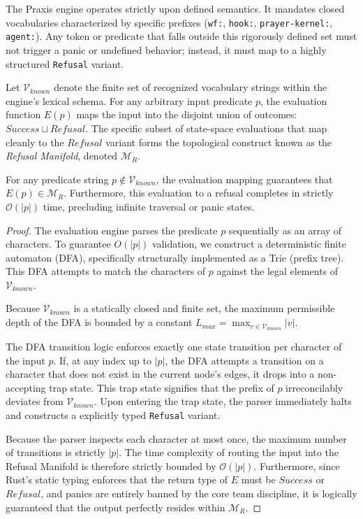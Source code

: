The Praxis engine operates strictly upon defined semantics. It mandates closed vocabularies characterized by specific prefixes (\texttt{wf:}, \texttt{hook:}, \texttt{prayer-kernel:}, \texttt{agent:}). Any token or predicate that falls outside this rigorously defined set must not trigger a panic or undefined behavior; instead, it must map to a highly structured \texttt{Refusal} variant. 

\begin{definition}
Let $\mathcal{V}_{known}$ denote the finite set of recognized vocabulary strings within the engine's lexical schema. For any arbitrary input predicate $p$, the evaluation function $E(p)$ maps the input into the disjoint union of outcomes: $Success \sqcup Refusal$. The specific subset of state-space evaluations that map cleanly to the $Refusal$ variant forms the topological construct known as the \textit{Refusal Manifold}, denoted $\mathcal{M}_R$.
\end{definition}

\begin{theorem}
\label{thm:refusal_completeness}
For any predicate string $p \notin \mathcal{V}_{known}$, the evaluation mapping guarantees that $E(p) \in \mathcal{M}_R$. Furthermore, this evaluation to a refusal completes in strictly $\mathcal{O}(|p|)$ time, precluding infinite traversal or panic states.
\end{theorem}

\begin{proof}
The evaluation engine parses the predicate $p$ sequentially as an array of characters. To guarantee $O(|p|)$ validation, we construct a deterministic finite automaton (DFA), specifically structurally implemented as a Trie (prefix tree). This DFA attempts to match the characters of $p$ against the legal elements of $\mathcal{V}_{known}$.

Because $\mathcal{V}_{known}$ is a statically closed and finite set, the maximum permissible depth of the DFA is bounded by a constant $L_{max} = \max_{v \in \mathcal{V}_{known}} |v|$.

The DFA transition logic enforces exactly one state transition per character of the input $p$. 
If, at any index up to $|p|$, the DFA attempts a transition on a character that does not exist in the current node's edges, it drops into a non-accepting trap state. This trap state signifies that the prefix of $p$ irreconcilably deviates from $\mathcal{V}_{known}$. Upon entering the trap state, the parser immediately halts and constructs a explicitly typed \texttt{Refusal} variant.

Because the parser inspects each character at most once, the maximum number of transitions is strictly $|p|$. The time complexity of routing the input into the Refusal Manifold is therefore strictly bounded by $\mathcal{O}(|p|)$. Furthermore, since Rust's static typing enforces that the return type of $E$ must be $Success$ or $Refusal$, and panics are entirely banned by the core team discipline, it is logically guaranteed that the output perfectly resides within $\mathcal{M}_R$.
\end{proof}

